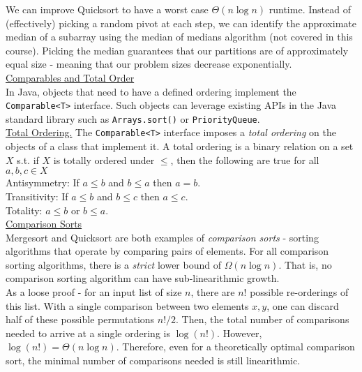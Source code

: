 \documentclass[12pt, fleqn]{general}
\begin{document}
\begin{multicols*}{2}
    We can improve Quicksort to have a worst case $\Theta(n\log n)$ runtime. Instead of (effectively) picking a random pivot at each step, we can identify the approximate median of a subarray using the median of medians algorithm (not covered in this course). Picking the median guarantees that our partitions are of approximately equal size - meaning that our problem sizes decrease exponentially.\\


    {\large \underline{Comparables and Total Order}}\\

    In Java, objects that need to have a defined ordering implement the \texttt{Comparable<T>} interface. Such objects can leverage existing APIs in the Java standard library such as \texttt{Arrays.sort()} or \texttt{PriorityQueue}.\\

    \underline{Total Ordering.} The \texttt{Comparable<T>} interface imposes a \emph{total ordering} on the objects of a class that implement it. A total ordering is a binary relation on a set $X$ s.t. if $X$ is totally ordered under $\leq$, then the following are true for all $a, b, c \in X$\\

    Antisymmetry: If $a \leq b$ and $b \leq a$ then $a = b$.\\
    Transitivity: If $a \leq b$ and $b \leq c$ then $a \leq c$.\\
    Totality: $a \leq b$ or $b \leq a$.\\


    {\large \underline{Comparison Sorts}}\\

    Mergesort and Quicksort are both examples of \emph{comparison sorts} - sorting algorithms that operate by comparing pairs of elements. For all comparison sorting algorithms, there is a \emph{strict} lower bound of $\Omega(n \log n)$. That is, no comparison sorting algorithm can have sub-linearithmic growth.\\

    As a loose proof - for an input list of size $n$, there are $n!$ possible re-orderings of this list. With a single comparison between two elements $x, y$, one can discard half of these possible permutations $n! / 2$. Then, the total number of comparisons needed to arrive at a single ordering is $\log(n!)$. However, $\log(n!) = \Theta(n \log n)$. Therefore, even for a theoretically optimal comparison sort, the minimal number of comparisons needed is still linearithmic.\\


\end{multicols*}
\end{document}
